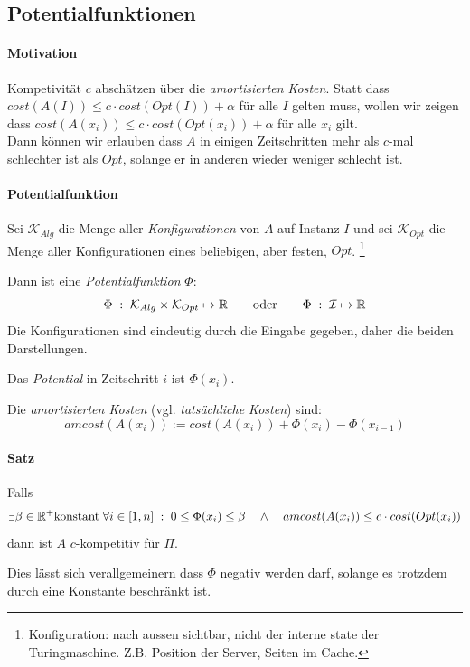 \subsection{Potentialfunktionen}

\paragraph{Motivation}
Kompetivität $c$ abschätzen über die \emph{amortisierten Kosten}.
Statt dass $cost(A(I)) \leq c \cdot cost(Opt(I)) + \alpha$ für alle $I$ gelten muss,
wollen wir zeigen dass $cost(A(x_i)) \leq c \cdot cost(Opt(x_i)) + \alpha$ für alle $x_i$ gilt.
\\
Dann können wir erlauben dass $A$ in einigen Zeitschritten mehr als $c$-mal schlechter ist als $Opt$,
solange er in anderen wieder weniger schlecht ist.

\paragraph{Potentialfunktion}
Sei $\mathcal{K}_{Alg}$ die Menge aller \emph{Konfigurationen} von $A$ auf Instanz $I$
und sei $\mathcal{K}_{Opt}$ die Menge aller Konfigurationen eines beliebigen, aber festen, $Opt$.
\footnote{Konfiguration: nach aussen sichtbar, nicht der interne state der Turingmaschine.
Z.B. Position der Server, Seiten im Cache.}

Dann ist eine \emph{Potentialfunktion} $\Phi$:
$$
\Phi \; : \;  \mathcal{K}_{Alg} \times \mathcal{K}_{Opt} \mapsto \mathbb{R}
\qquad \text{oder} \qquad
\Phi \; : \; \mathcal{I} \mapsto \mathbb{R}
$$
Die Konfigurationen sind eindeutig durch die Eingabe gegeben, daher die beiden Darstellungen.

Das \emph{Potential} in Zeitschritt $i$ ist $\Phi(x_i)$.

Die \emph{amortisierten Kosten} (vgl. \emph{tatsächliche Kosten}) sind:
$$ amcost(A(x_i)) := cost(A(x_i)) + \Phi(x_i) - \Phi(x_{i-1})$$

\paragraph{Satz}
Falls
$$ \exists \beta \in \mathbb{R}^+ \text{konstant} \; \forall i \in [1,n] \; : \; 0 \leq \Phi(x_i) \leq \beta
\quad \wedge \quad
amcost(A(x_i)) \leq c \cdot cost(Opt(x_i))
$$
dann ist $A$ $c$-kompetitiv für $\Pi$.

Dies lässt sich verallgemeinern dass $\Phi$ negativ werden darf, solange es trotzdem durch
eine Konstante beschränkt ist.

